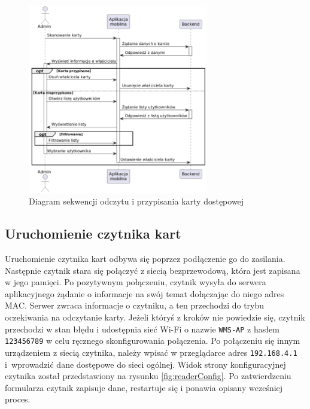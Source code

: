 \begin{figure}[H]
    \centering
    \includegraphics[width=0.7\textwidth]{graf/cardSeq.png}
    \caption{Diagram sekwencji odczytu i przypisania karty dostępowej}
    \label{fig:assignCard}
\end{figure}

\subsection{Uruchomienie czytnika kart}

Uruchomienie czytnika kart odbywa się poprzez podłączenie go do zasilania. Następnie czytnik stara się połączyć z siecią bezprzewodową, która jest zapisana w jego pamięci. Po pozytywnym połączeniu, czytnik wysyła do serwera aplikacyjnego żądanie o informacje na swój temat dołączając do niego adres MAC. Serwer zwraca informacje o czytniku, a ten przechodzi do trybu oczekiwania na odczytanie karty. Jeżeli któryś z kroków nie powiedzie się, czytnik przechodzi w stan błędu i udostępnia sieć Wi-Fi o nazwie \texttt{WMS-AP} z hasłem \texttt{123456789} w celu ręcznego skonfigurowania połączenia. Po połączeniu się innym urządzeniem z siecią czytnika, należy wpisać w przeglądarce adres \texttt{192.168.4.1} i~wprowadzić dane dostępowe do sieci ogólnej. Widok strony konfiguracyjnej czytnika został przedstawiony na rysunku \ref{fig:readerConfig}. Po zatwierdzeniu formularza czytnik zapisuje dane, restartuje się i ponawia opisany wcześniej proces.
\newpage
